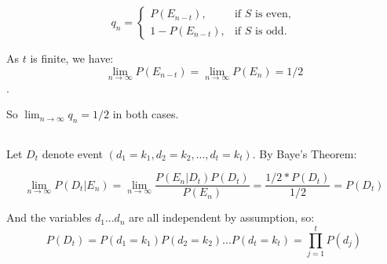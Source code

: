 \documentclass{article}
\begin{document}
$$q_n  = \begin{cases}
  P(E_{n-t}), & \text{if } S \text{ is even}, \\
  1 - P(E_{n-t}), & \text{if }  S \text{ is odd}.
\end{cases}$$

As $t$ is finite, we have:
$$\lim_{n\to\infty} P(E_{n-t}) = \lim_{n\to\infty} P(E_{n})  = 1/2$$. 

So $\lim_{n\to\infty} q_n = 1/2$ in both cases.

\subsection{}
Let $D_t$ denote event $(d_1 = k_1, d_2 = k_2,..., d_t = k_t)$. By Baye's Theorem:

$$ \lim_{n\to\infty} P(D_t | E_n) = \lim_{n\to\infty} \frac{P(E_n | D_t)P(D_t)}{P(E_n)} = \frac{1/2* P(D_t)}{1/2} = P(D_t) $$

And the variables $d_1...d_n$ are all independent by assumption, so:
$$P(D_t) = P(d_1 = k_1) P(d_2 = k_2) ... P(d_t = k_t) = \prod_{j=1}^{t} P(d_j)$$ 
\end{document}
